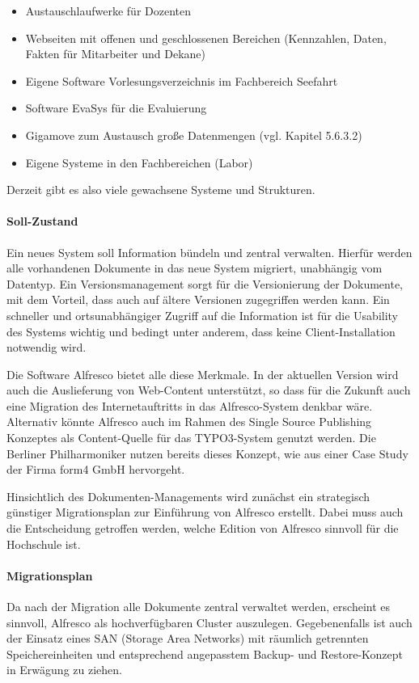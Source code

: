 \begin{itemize}
	\item Austauschlaufwerke für Dozenten
	\item Webseiten mit offenen und geschlossenen Bereichen (Kennzahlen, Daten, Fakten für Mitarbeiter und Dekane)
	\item Eigene Software Vorlesungsverzeichnis im Fachbereich Seefahrt
	\item Software EvaSys für die Evaluierung
	\item Gigamove zum Austausch große Datenmengen (vgl. Kapitel 5.6.3.2)
	\item Eigene Systeme in den Fachbereichen (Labor)	
\end{itemize}

Derzeit gibt es also viele gewachsene Systeme und Strukturen.

\paragraph{Soll-Zustand}
Ein neues System soll Information bündeln und zentral verwalten. Hierfür werden alle vorhandenen Dokumente in das neue System migriert, unabhängig vom Datentyp. Ein Versionsmanagement sorgt für die Versionierung der Dokumente, mit dem Vorteil, dass auch auf ältere Versionen zugegriffen werden kann. Ein schneller und ortsunabhängiger Zugriff auf die Information ist für die Usability des Systems wichtig und bedingt unter anderem, dass keine Client-Installation notwendig wird.

Die Software Alfresco bietet alle diese Merkmale. In der aktuellen Version wird auch die Auslieferung von Web-Content unterstützt, so dass für die Zukunft auch eine Migration des Internetauftritts in das Alfresco-System denkbar wäre. Alternativ könnte Alfresco auch im Rahmen des Single Source Publishing Konzeptes als Content-Quelle für das TYPO3-System genutzt werden. Die Berliner Philharmoniker nutzen bereits dieses Konzept, wie aus einer Case Study der Firma form4 GmbH hervorgeht.\cite{form4_alfresco_2015}

Hinsichtlich des Dokumenten-Managements wird zunächst ein strategisch günstiger Migrationsplan zur Einführung von Alfresco erstellt. Dabei muss auch die Entscheidung getroffen werden, welche Edition von Alfresco sinnvoll für die Hochschule ist.

\paragraph{Migrationsplan}
Da nach der Migration alle Dokumente zentral verwaltet werden, erscheint es sinnvoll, Alfresco als hochverfügbaren Cluster auszulegen. Gegebenenfalls ist auch der Einsatz eines SAN (Storage Area Networks) mit räumlich getrennten Speichereinheiten und entsprechend angepasstem Backup- und Restore-Konzept in Erwägung zu ziehen.

